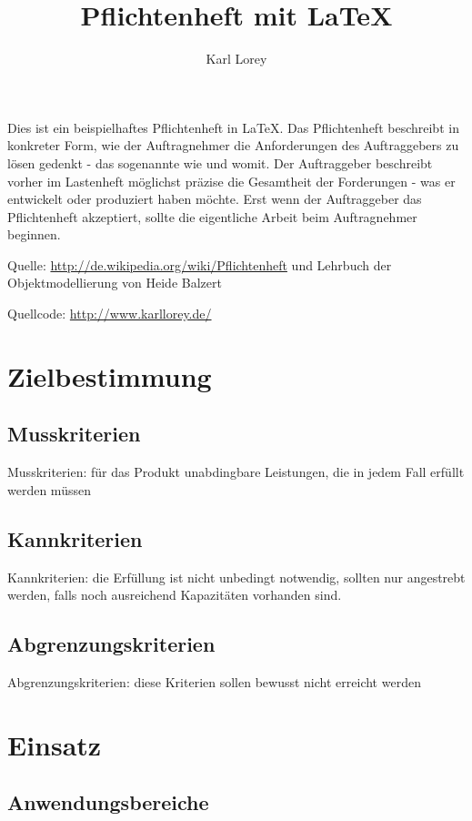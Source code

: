 \documentclass[a4paper]{scrreprt}
\begin{document}
 
\title{Pflichtenheft mit LaTeX}
\author{Karl Lorey}
\maketitle
 
\tableofcontents
\vspace{1cm}
Dies ist ein beispielhaftes Pflichtenheft in \LaTeX. Das Pflichtenheft
beschreibt in konkreter Form, wie der Auftragnehmer die Anforderungen des
Auftraggebers zu lösen gedenkt - das sogenannte wie und womit. Der Auftraggeber
beschreibt vorher im Lastenheft möglichst präzise die Gesamtheit der Forderungen
 - was er entwickelt oder produziert haben möchte. Erst wenn der Auftraggeber
das Pflichtenheft akzeptiert, sollte die eigentliche Arbeit beim Auftragnehmer
beginnen.
 
Quelle: \url{http://de.wikipedia.org/wiki/Pflichtenheft} und Lehrbuch der Objektmodellierung von Heide Balzert
 
Quellcode: \url{http://www.karllorey.de/}
 
\chapter{Zielbestimmung}
 
\section{Musskriterien}
Musskriterien: für das Produkt unabdingbare Leistungen, die in jedem Fall
erfüllt werden müssen
 
\section{Kannkriterien}
Kannkriterien: die Erfüllung ist nicht unbedingt notwendig, sollten nur
angestrebt werden, falls noch ausreichend Kapazitäten vorhanden sind.
 
\section{Abgrenzungskriterien}
Abgrenzungskriterien: diese Kriterien sollen bewusst nicht erreicht werden
 
\chapter{Einsatz}
 
\section{Anwendungsbereiche}
 
\end{document}
